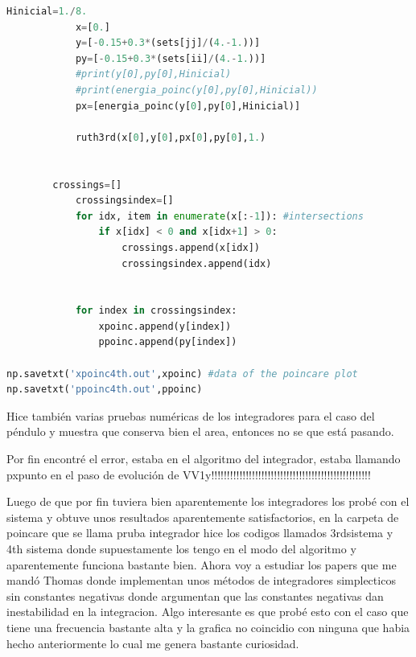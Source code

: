 \documentclass[idxtotoc,hyperref,openany]{labbook} %
\begin{document}
\begin{lstlisting}[language=Python]
            Hinicial=1./8.
            x=[0.] 
            y=[-0.15+0.3*(sets[jj]/(4.-1.))]
            py=[-0.15+0.3*(sets[ii]/(4.-1.))]
            #print(y[0],py[0],Hinicial) 
            #print(energia_poinc(y[0],py[0],Hinicial))
            px=[energia_poinc(y[0],py[0],Hinicial)] 
            
            ruth3rd(x[0],y[0],px[0],py[0],1.)       
        

	    crossings=[]
            crossingsindex=[]    
            for idx, item in enumerate(x[:-1]): #intersections
                if x[idx] < 0 and x[idx+1] > 0:
                    crossings.append(x[idx])
                    crossingsindex.append(idx)
                
            
            for index in crossingsindex:
                xpoinc.append(y[index])
                ppoinc.append(py[index])

np.savetxt('xpoinc4th.out',xpoinc) #data of the poincare plot
np.savetxt('ppoinc4th.out',ppoinc)
\end{lstlisting}

Hice también varias pruebas numéricas de los integradores para el caso del péndulo y muestra que conserva bien el area, entonces no se que está pasando.\par

Por fin encontré el error, estaba en el algoritmo del integrador, estaba llamando pxpunto en el paso de evolución de VV1y!!!!!!!!!!!!!!!!!!!!!!!!!!!!!!!!!!!!!!!!!!!!!!!!!!!




Luego de que por fin tuviera bien aparentemente los integradores los probé con el sistema y obtuve unos resultados aparentemente satisfactorios, en la carpeta de poincare que se llama pruba integrador hice los codigos llamados 3rdsistema y 4th sistema donde supuestamente los tengo en el modo del algoritmo y aparentemente funciona bastante bien. Ahora voy a estudiar los papers que me mandó Thomas donde implementan unos métodos de integradores simplecticos sin constantes negativas donde argumentan que las constantes negativas dan inestabilidad en la integracion. Algo interesante es que probé esto con el caso que tiene una frecuencia bastante alta y la grafica no coincidio con ninguna que habia hecho anteriormente lo cual me genera bastante curiosidad.


\end{document}
